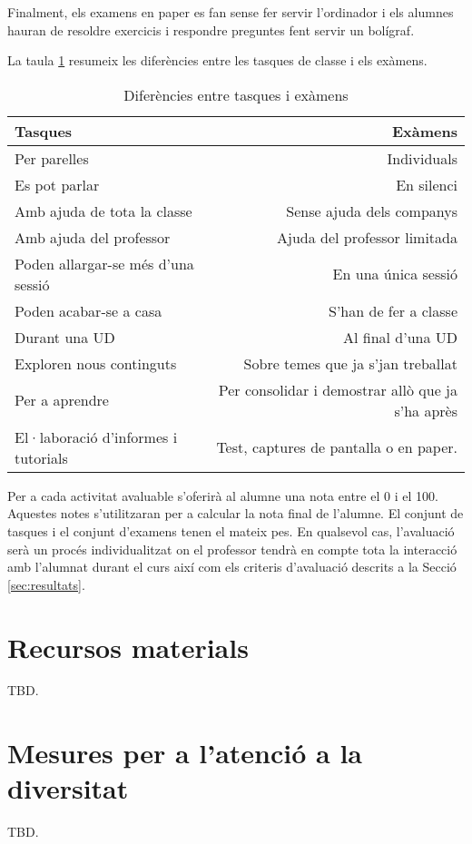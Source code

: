 \documentclass[catalan, a4paper, 12pt, titlepage]{article}
\begin{document}
Finalment, els examens en paper es fan sense fer servir l'ordinador i els alumnes hauran de resoldre exercicis i respondre preguntes fent servir un bolígraf.

La taula \ref{tab:tasquesiexamens} resumeix les diferències entre les tasques de classe i els exàmens.

\begin{table}
        \centering
        \begin{tabular}{lr}
        Tasques & Exàmens\\
        \hline
	Per parelles & Individuals\\
		Es pot parlar & En silenci \\
		Amb ajuda de tota la classe &Sense ajuda dels companys\\
		Amb ajuda del professor & Ajuda del professor limitada\\
		Poden allargar-se més d'una sessió & En una única sessió\\
		Poden acabar-se a casa & S'han de fer a classe\\
		Durant una UD & Al final d'una UD \\
		Exploren nous continguts & Sobre temes que ja s'jan treballat\\
		Per a aprendre & Per consolidar i demostrar allò que ja s'ha après\\
		El·laboració d'informes i tutorials & Test, captures de pantalla o en paper.

\end{tabular}
        \caption{Diferències entre tasques i exàmens} \label{tab:tasquesiexamens}
\end{table}

Per a cada activitat avaluable s'oferirà al alumne una nota entre el 0 i el 100.
Aquestes notes s'utilitzaran per a calcular la nota final de l'alumne.
El conjunt de tasques i el conjunt d'examens tenen el mateix pes.
En qualsevol cas, l'avaluació serà un procés individualitzat on el professor tendrà en compte tota la interacció amb l'alumnat durant el curs així com els criteris d'avaluació descrits a la Secció \ref{sec:resultats}.

\section{Recursos materials}
TBD.

\section{Mesures per a l'atenció a la diversitat}
TBD.
\end{document}
